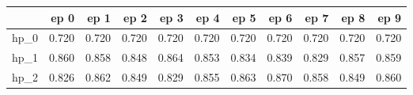 \begin{tabular}{lrrrrrrrrrr}
\toprule
{} &   ep 0 &   ep 1 &   ep 2 &   ep 3 &   ep 4 &   ep 5 &   ep 6 &   ep 7 &   ep 8 &   ep 9 \\
\midrule
hp\_0 &  0.720 &  0.720 &  0.720 &  0.720 &  0.720 &  0.720 &  0.720 &  0.720 &  0.720 &  0.720 \\
hp\_1 &  0.860 &  0.858 &  0.848 &  0.864 &  0.853 &  0.834 &  0.839 &  0.829 &  0.857 &  0.859 \\
hp\_2 &  0.826 &  0.862 &  0.849 &  0.829 &  0.855 &  0.863 &  0.870 &  0.858 &  0.849 &  0.860 \\
\bottomrule
\end{tabular}
